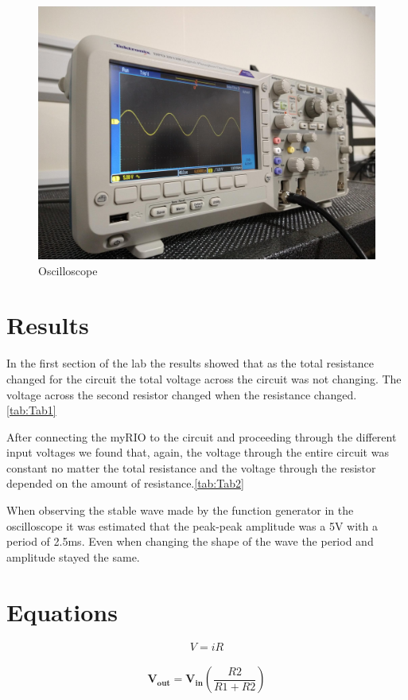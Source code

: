 \documentclass[10pt,twocolumn]{article}
\begin{document}
\begin{figure}
	\centering
	\includegraphics[width=.9\linewidth]{figures/Oscilloscope.PNG}
	\caption{Oscilloscope}
	\label{fig:stable}
\end{figure}


\section{Results}

 In the first section of the lab the results showed that as the total resistance changed for the circuit the total voltage across the circuit was not changing. The voltage across the second resistor changed when the resistance changed. \autoref{tab:Tab1}
 
 	After connecting the myRIO to the circuit and proceeding through the different input voltages we found that, again, the voltage through the entire circuit was constant no matter the total resistance and the voltage through the resistor depended on the amount of resistance.\autoref{tab:Tab2}
 	
 	When observing the stable wave made by the function generator in the oscilloscope it was estimated that the peak-peak amplitude was a 5V with a period of 2.5ms. Even when changing the shape of the wave the period and amplitude stayed the same.  
 	  
\section{Equations}


	\begin{equation}\label{eq:1}
		 V=iR
	\end{equation}
\\
	\begin{equation}\label{eq:2}
		\bm{V_{out}} = \bm{V_{in}}\left(\frac{R2}{R1+R2}\right)
	\end{equation}
\end{document}
